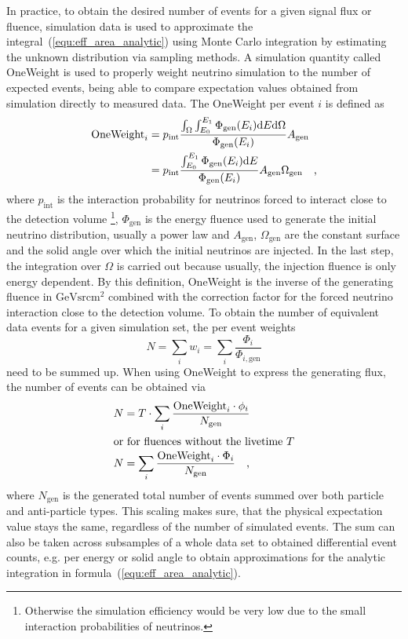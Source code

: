 In practice, to obtain the desired number of events for a given signal flux or fluence, simulation data is used to approximate the integral~(\ref{equ:eff_area_analytic}) using Monte Carlo integration by estimating the unknown distribution via sampling methods.
A simulation quantity called OneWeight is used to properly weight neutrino simulation to the number of expected events, being able to compare expectation values obtained from simulation directly to measured data.
The OneWeight per event $i$ is defined as \cite{Gazizov:2004va}
\begin{align}
  \label{equ:oneweight_definition}
  \text{OneWeight}_i
  &= p_\text{int}\frac{\int_\Omega\int_{E_0}^{E_1}
                       \Phi_\text{gen}(E_i)\mathrm{d}E\mathrm{d}\Omega
                       }{\Phi_\text{gen}(E_i)}A_\text{gen} \\
  &= p_\text{int}\frac{\int_{E_0}^{E_1}\Phi_\text{gen}(E_i)\mathrm{d}E}
                      {\Phi_\text{gen}(E_i)}
    A_\text{gen}\Omega_\text{gen}
  \quad\text{,}
\end{align}
where $p_\text{int}$ is the interaction probability for neutrinos forced to interact close to the detection volume \footnote{Otherwise the simulation efficiency would be very low due to the small interaction probabilities of neutrinos.}, $\Phi_\text{gen}$ is the energy fluence used to generate the initial neutrino distribution, usually a power law and $A_\text{gen}$, $\Omega_\text{gen}$ are the constant surface and the solid angle over which the initial neutrinos are injected.
In the last step, the integration over $\Omega$ is carried out because usually, the injection fluence is only energy dependent.
By this definition, OneWeight is the inverse of the generating fluence in $\si{\GeV\steradian\cm\squared}$ combined with the correction factor for the forced neutrino interaction close to the detection volume.
To obtain the number of equivalent data events for a given simulation set, the per event weights
\begin{equation}
  N = \sum_i w_i = \sum_i \frac{\Phi_i}{\Phi_{i,\text{gen}}}
\end{equation}
need to be summed up.
When using OneWeight to express the generating flux, the number of events can be obtained via
\begin{align}
  N &= T \cdot \sum_i \frac{\text{OneWeight}_i \cdot \phi_i}{N_\text{gen}} \\
  \intertext{or for fluences without the livetime $T$}
  N &= \sum_i \frac{\text{OneWeight}_i \cdot \Phi_i}{N_\text{gen}}
  \quad\text{,}
\end{align}
where $N_\text{gen}$ is the generated total number of events summed over both particle and anti-particle types.
This scaling makes sure, that the physical expectation value stays the same, regardless of the number of simulated events.
The sum can also be taken across subsamples of a whole data set to obtained differential event counts, e.g. per energy or solid angle to obtain approximations for the analytic integration in formula~(\ref{equ:eff_area_analytic}).

